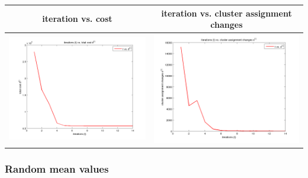 \documentclass[fleqn]{article}
\begin{document}
\begin{center}
  \begin{longtable}{ c | c }
	\multicolumn{1}{c}{iteration vs. cost} & 
	\multicolumn{1}{c}{iteration vs. cluster assignment changes}  \\
    \hline
    \includegraphics[scale=0.4]{./pics/task1and2/spectrum_k=7_equidistant/t_vs_d_mid_equidistant_7_spectrum.png}  & \includegraphics[scale=0.4]{./pics/task1and2/spectrum_k=7_equidistant/t_vs_s_mid_equidistant_7_spectrum.png} \\
    \hline
  \end{longtable}
\end{center}

\subsubsection{Random mean values}
\end{document}
